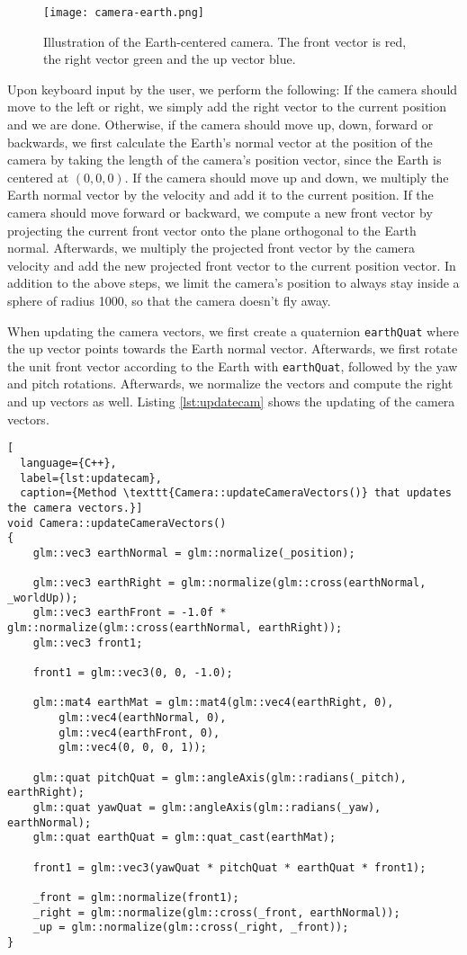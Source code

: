 \begin{figure}[H]
  \centering
  \texttt{[image: camera-earth.png]}
  \caption{Illustration of the Earth-centered camera. The front vector is red, the right vector green and the up vector blue.}\label{fig:camera-earth}
\end{figure}

Upon keyboard input by the user, we perform the following:
If the camera should move to the left or right, we simply add 
the right vector to the current position and we are done.
Otherwise, if the camera should move up, down, forward or backwards,
we first calculate the Earth's normal vector at the position 
of the camera by taking the length of the camera's position vector,
since the Earth is centered at $(0,0,0)$.
If the camera should move up and down, we multiply the Earth normal vector 
by the velocity and add it to the current position.
If the camera should move forward or backward, we compute a new front vector by projecting the current 
front vector onto the plane orthogonal to the Earth normal. 
Afterwards, we multiply the projected front vector 
by the camera velocity and add the new 
projected front vector to the current position vector.
In addition to the above steps, we limit the camera's position to 
always stay inside a sphere of radius 1000, so that the camera 
doesn't fly away. 

When updating the camera vectors, we first create 
a quaternion \texttt{earthQuat} where the up vector points towards the Earth normal vector.
Afterwards, we first rotate the unit front vector 
according to the Earth with \texttt{earthQuat}, followed by the yaw and pitch rotations.
Afterwards, we normalize the vectors and compute the right and up vectors as well.
Listing \ref{lst:updatecam} shows the 
updating of the camera vectors.

\begin{lstlisting}[
  language={C++},
  label={lst:updatecam},
  caption={Method \texttt{Camera::updateCameraVectors()} that updates the camera vectors.}]
void Camera::updateCameraVectors()
{
    glm::vec3 earthNormal = glm::normalize(_position);

    glm::vec3 earthRight = glm::normalize(glm::cross(earthNormal, _worldUp));
    glm::vec3 earthFront = -1.0f * glm::normalize(glm::cross(earthNormal, earthRight));
    glm::vec3 front1;

    front1 = glm::vec3(0, 0, -1.0);

    glm::mat4 earthMat = glm::mat4(glm::vec4(earthRight, 0),
        glm::vec4(earthNormal, 0),
        glm::vec4(earthFront, 0),
        glm::vec4(0, 0, 0, 1));

    glm::quat pitchQuat = glm::angleAxis(glm::radians(_pitch), earthRight);
    glm::quat yawQuat = glm::angleAxis(glm::radians(_yaw), earthNormal);
    glm::quat earthQuat = glm::quat_cast(earthMat);

    front1 = glm::vec3(yawQuat * pitchQuat * earthQuat * front1);

    _front = glm::normalize(front1);
    _right = glm::normalize(glm::cross(_front, earthNormal));
    _up = glm::normalize(glm::cross(_right, _front));
}
\end{lstlisting}

